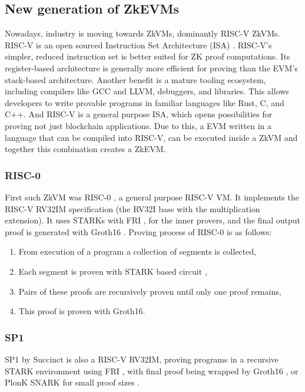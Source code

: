 \subsection{New generation of ZkEVMs}

Nowadays, industry is moving towards ZkVMs, dominantly RISC-V ZkVMs. RISC-V is
an open sourced Instruction Set Architecture (ISA) \cite{RISCV}. RISC-V's
simpler, reduced instruction set is better suited for ZK proof computations.
Its register-based architecture is generally more efficient for proving than
the EVM's stack-based architecture. Another benefit is a mature tooling
ecosystem, including compilers like GCC and LLVM, debuggers, and libraries.
This allows developers to write provable programs in familiar languages like
Rust, C, and C++. And RISC-V is a general purpose ISA, which opens possibilities
for proving not just blockchain applications. Due to this, a EVM written in
a language that can be compiled into RISC-V, can be executed inside a ZkVM and
together this combination creates a ZkEVM.

\subsubsection*{RISC-0}

First such ZkVM was RISC-0 \cite{RISC0}, a general purpose RISC-V VM. It implements
the RISC-V RV32IM specification (the RV32I base with the multiplication extension).
It uses STARKs \cite{STARK} with FRI \cite{FRI}, for the inner provers, and
the final output proof is generated with Groth16 \cite{Groth16}. Proving
process of RISC-0 is as follows:

\begin{enumerate}
	\item From execution of a program a collection of segments is collected,
	\item Each segment is proven with STARK based circuit \cite{RISC0ProofSystem},
	\item Pairs of these proofs are recursively proven until only one proof remains,
	\item This proof is proven with Groth16.
\end{enumerate}

\subsubsection*{SP1}

SP1 by Succinct is also a RISC-V RV32IM, proving programs in a recursive STARK \cite{STARK}
environment using FRI \cite{FRI}, with final proof being wrapped by Groth16
\cite{Groth16}, or PlonK \cite{Plonk} SNARK for small proof sizes \cite{SP1}.

